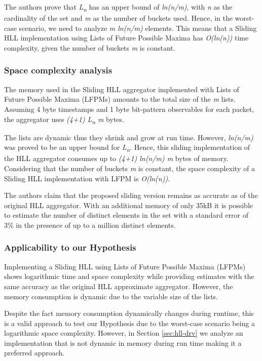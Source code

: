 The authors prove that \textit{L\textsubscript{n}} has an upper bound of \textit{ln(n/m)}, with \textit{n} as the cardinality of the set and \textit{m} as the number of buckets used. Hence, in the worst-case scenario, we need to analyze \textit{m ln(n/m)} elements. This means that a Sliding HLL implementation using Lists of Future Possible Maxima has \textit{O(ln(n))} time complexity, given the number of buckets \textit{m} is constant.

\subsubsection*{Space complexity analysis}
The memory used in the Sliding HLL aggregator implemented with Lists of Future Possible Maxima (LFPMs) amounts to the total size of the \textit{m} lists. Assuming 4 byte timestamps and 1 byte bit-pattern observables for each packet, the aggregator uses \textit{(4+1) L\textsubscript{n} m} bytes. 

The lists are dynamic thus they shrink and grow at run time. However, \textit{ln(n/m)} was proved to be an upper bound for \textit{L\textsubscript{n}}. Hence, this sliding implementation of the HLL aggregator consumes up to \textit{(4+1) ln(n/m) m} bytes of memory. Considering that the number of buckets \textit{m} is constant, the space complexity of a Sliding HLL implementation with LFPM is \textit{O(ln(n))}.

The authors claim that the proposed sliding version remains as accurate as of the original HLL aggregator. With an additional memory of only 35kB it is possible to estimate the number of distinct elements in the set with a standard error of 3\% in the presence of up to a million distinct elements.

\subsubsection*{Applicability to our Hypothesis}
Implementing a Sliding HLL using Lists of Future Possible Maxima (LFPMs) shows logarithmic time and space complexity while providing estimates with the same accuracy as the original HLL approximate aggregator. However, the memory consumption is dynamic due to the variable size of the lists. 

Despite the fact memory consumption dynamically changes during runtime, this is a valid approach to test our Hypothesis due to the worst-case scenario being a logarithmic space complexity. However, in Section \ref{sec:hll-drv} we analyze an implementation that is not dynamic in memory during run time making it a preferred approach.



